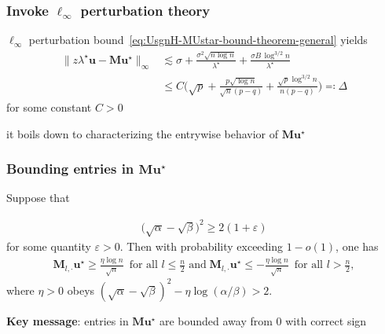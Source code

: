 \documentclass[compress,
mathserif,wide,%
]{beamer}
\begin{document}
\begin{frame}
\frametitle{Invoke $\ell_{\infty}$ perturbation theory}
$\ell_{\infty}$ perturbation bound~\eqref{eq:UsgnH-MUstar-bound-theorem-general} yields
\begin{align*}
	\big\| z\lambda^{\star}\bm{u}-\bm{M}\bm{u}^{\star} \big\|_{\infty} & \lesssim\sigma+\frac{\sigma^{2}\sqrt{n\log n}}{\lambda^{\star}}+\frac{\sigma B\,\log^{3/2}n}{\lambda^{\star}}\nonumber \\
 	& \leq  C \Big( \sqrt{p}+\frac{p\sqrt{\log n}}{\sqrt{n}(p-q)}+\frac{\sqrt{p}\log^{3/2}n}{n(p-q)} \Big) \eqqcolon \Delta
\end{align*}
for some constant $C>0$

\vfill
{

\begin{varblock}[\textwidth]{}
\begin{center}
	it boils down to characterizing the entrywise behavior of $\bm{M}\bm{u}^{\star}$
\end{center}
\end{varblock}
}

\end{frame}


\begin{frame}
	\frametitle{Bounding entries in $\bm{M}\bm{u}^{\star}$}	
\begin{lemma}
	\label{lemma:M-ustar-lower-bound-CD}
	Suppose that
	
	\vspace{-2em}
\begin{align*}
	\big( \sqrt{\alpha} -\sqrt{\beta}\big)^2 \geq 2 \left ( 1+ \varepsilon  \right)  
\end{align*}
% 
for some quantity $\varepsilon>0$.   
Then with probability exceeding $1- o(1)$, one has
%
\begin{align*}
	 \bm{M}_{l,\cdot}\bm{u}^{\star}   \geq \frac{\eta \log n}{\sqrt{n}} \,\,\,\text{for all }l\leq \frac{n}{2}
	\;\text{and}\;
	   \bm{M}_{l,\cdot} \bm{u}^{\star}  
	\leq - \frac{\eta \log n}{\sqrt{n}} \,\,\, \text{for all } l > \frac{n}{2}, 
\end{align*}
where $\eta > 0$ obeys $(\sqrt{\alpha} - \sqrt{\beta})^2 - \eta \log (\alpha/\beta) > 2.$
%
\end{lemma}

\vfill
{\bf Key message}: entries in $\bm{M}\bm{u}^{\star}$ are bounded away from $0$ with correct sign
\end{frame}
\end{document}

